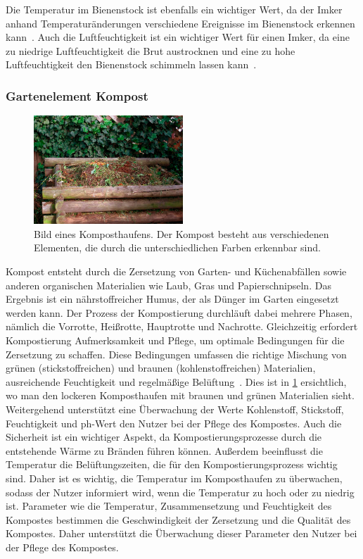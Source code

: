 Die Temperatur im Bienenstock ist ebenfalls ein wichtiger Wert, da der Imker anhand Temperaturänderungen verschiedene Ereignisse im Bienenstock erkennen kann~\cite{BienenTemperatur}.
Auch die Luftfeuchtigkeit ist ein wichtiger Wert für einen Imker, da eine zu niedrige Luftfeuchtigkeit die Brut austrocknen und eine zu hohe Luftfeuchtigkeit den Bienenstock schimmeln lassen kann~\cite{BienenLuftfeuchtigkeit}.

\subsubsection{Gartenelement Kompost}
\begin{figure}[!htb]
	\centering
	\includegraphics[width=0.5\textwidth]{images/Kompost.jpg}
	\caption[Bild eines Komposthaufens.]{
		Bild eines Komposthaufens.
		Der Kompost besteht aus verschiedenen Elementen, die durch die unterschiedlichen Farben erkennbar sind.\footnotemark
	}
	\label{pic:kompost}
\end{figure}
Kompost entsteht durch die Zersetzung von Garten- und Küchenabfällen sowie anderen organischen Materialien wie Laub, Gras und Papierschnipseln.
Das Ergebnis ist ein nährstoffreicher Humus, der als Dünger im Garten eingesetzt werden kann.
Der Prozess der Kompostierung durchläuft dabei mehrere Phasen, nämlich die Vorrotte, Heißrotte, Hauptrotte und Nachrotte.
Gleichzeitig erfordert Kompostierung Aufmerksamkeit und Pflege, um optimale Bedingungen für die Zersetzung zu schaffen.
Diese Bedingungen umfassen die richtige Mischung von grünen (stickstoffreichen) und braunen (kohlenstoffreichen) Materialien, ausreichende Feuchtigkeit und regelmäßige Belüftung~\cite{Kompost}.
Dies ist in \cref{pic:kompost} ersichtlich, wo man den lockeren Komposthaufen mit braunen und grünen Materialien sieht.
Weitergehend unterstützt eine Überwachung der Werte Kohlenstoff, Stickstoff, Feuchtigkeit und ph-Wert den Nutzer bei der Pflege des Kompostes.
Auch die Sicherheit ist ein wichtiger Aspekt, da Kompostierungsprozesse durch die entstehende Wärme zu Bränden führen können.
Außerdem beeinflusst die Temperatur die Belüftungszeiten, die für den Kompostierungsprozess wichtig sind.
Daher ist es wichtig, die Temperatur im Komposthaufen zu überwachen, sodass der Nutzer informiert wird, wenn die Temperatur zu hoch oder zu niedrig ist.
Parameter wie die Temperatur, Zusammensetzung und Feuchtigkeit des Kompostes bestimmen die Geschwindigkeit der Zersetzung und die Qualität des Kompostes.
Daher unterstützt die Überwachung dieser Parameter den Nutzer bei der Pflege des Kompostes.


